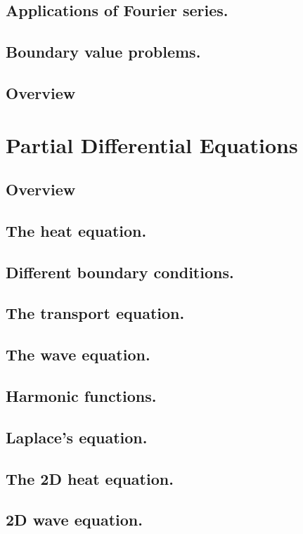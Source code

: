\documentclass{article}
\begin{document}
\subsection{Applications of Fourier series.}
\subsection{Boundary value problems.}

\subsection*{Overview}


\pagebreak
\section{Partial Differential Equations}
\subsection*{Overview}

\subsection{The heat equation.}
\subsection{Different boundary conditions.}
\subsection{The transport equation.}
\subsection{The wave equation.}
\subsection{Harmonic functions.}
\subsection{Laplace's equation.}
\subsection{The 2D heat equation.}
\subsection{2D wave equation.}
\end{document}
